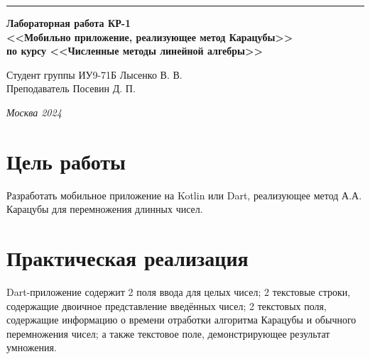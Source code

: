 \documentclass[a4paper, 14pt]{extarticle}
\begin{document}
\begin{titlepage}
\vspace*{-16pt}
\hspace{30pt}\rule{0.866\textwidth}{0.4pt}
  
\vspace{11em}

\begin{center}
\Large {\bf Лабораторная работа КР-1} \\ 
\large {\bf<<Мобильно приложение, реализующее метод Карацубы>>} \\ 
\large {\bf по курсу <<Численные методы линейной алгебры>>} \\ 
\end{center}\normalsize

\vspace{8em}


\begin{flushright}
  {Студент группы ИУ9-71Б Лысенко В. В.\hspace*{15pt} \\
  \vspace{2ex}
  Преподаватель Посевин Д. П.\hspace*{15pt}}
\end{flushright}

\bigskip

\vfill
 

\begin{center}
\textsl{Москва 2024}
\end{center}
\end{titlepage}

\renewcommand{\ttdefault}{pcr}

\setlength{\tabcolsep}{3pt}
\newpage
\setcounter{page}{2}

\section{Цель работы}\label{Sect::task}
\par
\renewcommand{\labelenumii}{\arabic{enumi}.\arabic{enumii}.}
Разработать мобильное приложение на Kotlin или Dart, реализующее метод А.А. Карацубы для перемножения длинных чисел.


\section{Практическая реализация}
Dart-приложение содержит 2 поля ввода для целых чисел; 2 текстовые строки, содержащие двоичное представление введённых чисел; 2 текстовых поля, содержащие информацию о времени отработки алгоритма Карацубы и обычного перемножения чисел; а также текстовое поле, демонстрирующее результат умножения.
\end{document}

